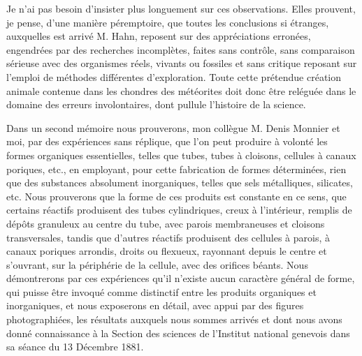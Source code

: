 \documentclass[a4paper, 12pt, oneside, french]{article}
\begin{document}
Je n'ai pas besoin d'insister plus longuement sur ces observations. Elles prouvent, je pense, d'une manière péremptoire, que toutes les conclusions si étranges, auxquelles est arrivé M. Hahn, reposent sur des appréciations erronées, engendrées par des recherches incomplètes, faites sans contrôle, sans comparaison sérieuse avec des organismes réels, vivants ou fossiles et sans critique reposant sur l'emploi de méthodes différentes d'exploration. Toute cette prétendue création animale contenue dans les chondres des météorites doit donc être reléguée dans le domaine des erreurs involontaires, dont pullule l'histoire de la science.

Dans un second mémoire nous prouverons, mon collègue M. Denis Monnier et moi, par des expériences sans réplique, que l'on peut produire à volonté les formes organiques essentielles, telles que tubes, tubes à cloisons, cellules à canaux poriques, etc., en employant, pour cette fabrication de formes déterminées, rien que des substances absolument inorganiques, telles que sels métalliques, silicates, etc. Nous prouverons que la forme de ces produits est constante en ce sens, que certains réactifs produisent des tubes cylindriques, creux à l'intérieur, remplis de dépôts granuleux au centre du tube, avec parois membraneuses et cloisons transversales, tandis que d'autres réactifs produisent des cellules à parois, à canaux poriques arrondis, droits ou flexueux, rayonnant depuis le centre et s'ouvrant, sur la périphérie de la cellule, avec des orifices béants. Nous démontrerons par ces expériences qu'il n'existe aucun caractère général de forme, qui puisse être invoqué comme distinctif entre les produits organiques et inorganiques, et nous exposerons en détail, avec appui par des figures photographiées, les résultats auxquels nous sommes arrivés et dont nous avons donné connaissance à la Section des sciences de l'Institut national genevois dans sa séance du 13 Décembre 1881.
\end{document}
